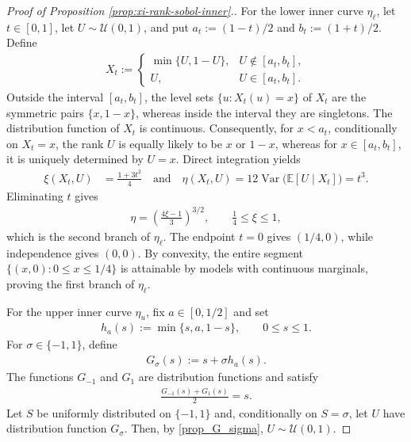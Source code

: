\documentclass{article}
\newcommand{\Var}{\operatorname{Var}}
\newcommand{\E}{\mathbb{E}}
\newcommand{\cU}{\mathcal{U}}
\begin{document}
\begin{proof}[Proof of Proposition \ref{prop:xi-rank-sobol-inner}.]
For the lower inner curve \(\eta_\ell\), let \(t\in[0,1]\), let \(U\sim\cU(0,1)\), and put \(a_t:=(1-t)/2\) and \(b_t:=(1+t)/2\).
Define
\begin{align*}
    X_t
    :=
    \begin{cases}
        \min\{U,1-U\}, & U\notin[a_t,b_t],\\
        U, & U\in[a_t,b_t].
    \end{cases}
\end{align*}
Outside the interval \([a_t,b_t]\), the level sets
\(\{u\colon X_t(u)=x\}\) of \(X_t\) are the symmetric pairs
\(\{x,1-x\}\), whereas inside the interval they are singletons.
The distribution function of \(X_t\) is continuous.
Consequently, for \(x<a_t\), conditionally on \(X_t=x\), the rank
\(U\) is equally likely to be \(x\) or \(1-x\), whereas for
\(x\in[a_t,b_t]\), it is uniquely determined by \(U=x\).
Direct integration yields
\begin{align*}
    \xi(X_t,U)
    &=
    \frac{1+3t^2}{4} \quad \text{and} \quad 
    \eta(X_t,U)
    =
    12\Var\bigl(\E[U\mid X_t]\bigr)
    =
    t^3.
\end{align*}
Eliminating \(t\) gives
\begin{align*}
    \eta
    =
    \left(\frac{4\xi-1}{3}\right)^{3/2},
    \qquad
    \frac14\leq\xi\leq1,
\end{align*}
which is the second branch of \(\eta_\ell\).
The endpoint \(t=0\) gives \((1/4,0)\), while independence gives \((0,0)\).
By convexity, the entire segment \(\{(x,0):0\leq x\leq1/4\}\) is attainable by models with continuous marginals, proving the first branch of \(\eta_\ell\).

For the upper inner curve \(\eta_u\), fix \(a\in[0,1/2]\) and set
\begin{align*}
    h_a(s):=\min\{s,a,1-s\},
    \qquad 0\leq s\leq1.
\end{align*}
For \(\sigma\in\{-1,1\}\), define
\begin{align}\label{def_G_sigma}
    G_\sigma(s):=s+\sigma h_a(s).
\end{align}
The functions \(G_{-1}\) and \(G_1\) are distribution functions and satisfy
\begin{align}\label{prop_G_sigma}
    \frac{G_{-1}(s)+G_1(s)}{2}=s.
\end{align}
Let \(S\) be uniformly distributed on \(\{-1,1\}\) and, conditionally on \(S=\sigma\), let \(U\) have distribution function \(G_\sigma\).
Then, by \eqref{prop_G_sigma}, \(U\sim\cU(0,1)\).


\end{proof}
\end{document}
